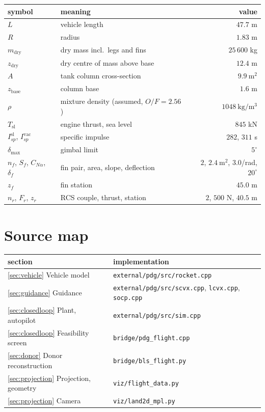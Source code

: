 \documentclass[11pt,a4paper]{article}
\newcommand{\code}[1]{\texttt{#1}}
\begin{document}
\begin{center}
\begin{tabular}{llr}
\toprule
symbol & meaning & value \\
\midrule
$L$ & vehicle length & $47.7$ m \\
$R$ & radius & $1.83$ m \\
$m_{\mathrm{dry}}$ & dry mass incl.\ legs and fins & $25\,600$ kg \\
$z_{\mathrm{dry}}$ & dry centre of mass above base & $12.4$ m \\
$A$ & tank column cross-section & $9.9\ \mathrm{m^2}$ \\
$z_{\mathrm{base}}$ & column base & $1.6$ m \\
$\rho$ & mixture density (assumed, $O/F=2.56$) & $1048\ \mathrm{kg/m^3}$ \\
$T_{\mathrm{sl}}$ & engine thrust, sea level & $845$ kN \\
$I_{sp}^{\mathrm{sl}}$, $I_{sp}^{\mathrm{vac}}$ & specific impulse & $282$, $311$ s \\
$\delta_{\max}$ & gimbal limit & $5^\circ$ \\
$n_f$, $S_f$, $C_{N\alpha}$, $\delta_f$ & fin pair, area, slope, deflection &
  $2$, $2.4\ \mathrm{m^2}$, $3.0$/rad, $20^\circ$ \\
$z_f$ & fin station & $45.0$ m \\
$n_r$, $F_r$, $z_r$ & RCS couple, thrust, station & $2$, $500$ N, $40.5$ m \\
\bottomrule
\end{tabular}
\end{center}

\section{Source map}

\begin{center}
\begin{tabular}{ll}
\toprule
section & implementation \\
\midrule
\ref{sec:vehicle} Vehicle model & \code{external/pdg/src/rocket.cpp} \\
\ref{sec:guidance} Guidance & \code{external/pdg/src/scvx.cpp}, \code{lcvx.cpp}, \code{socp.cpp} \\
\ref{sec:closedloop} Plant, autopilot & \code{external/pdg/src/sim.cpp} \\
\ref{sec:closedloop} Feasibility screen & \code{bridge/pdg\_flight.cpp} \\
\ref{sec:donor} Donor reconstruction & \code{bridge/bls\_flight.py} \\
\ref{sec:projection} Projection, geometry & \code{viz/flight\_data.py} \\
\ref{sec:projection} Camera & \code{viz/land2d\_mpl.py} \\
\bottomrule
\end{tabular}
\end{center}
\end{document}

